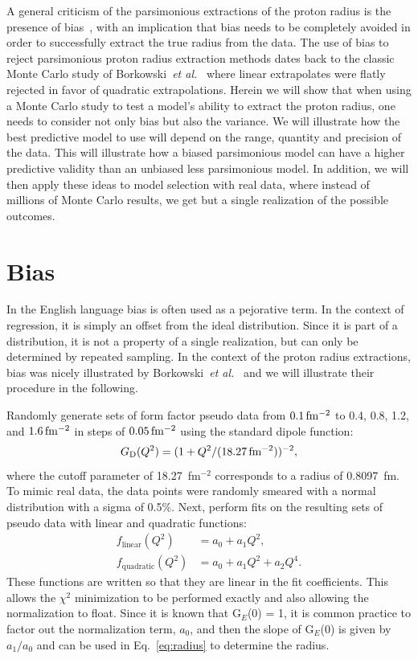 \documentclass[10pt,aps,prc,twocolumn]{revtex4-1}
\begin{document}
A general criticism of the parsimonious extractions of the proton radius is the presence of bias~\cite{Sick:2017aor,Sick:2018fzn},
with an implication that bias needs to be completely avoided in order to successfully extract the true radius from the data.
The use of bias to reject parsimonious proton radius extraction methods dates back to the classic Monte Carlo 
study of Borkowski~{\it{et al.}}~\cite{Borkowski:1975ume} where linear extrapolates were flatly rejected in favor of quadratic
extrapolations.  Herein we will show that when using a Monte Carlo study to test a model's ability
to extract the proton radius, one needs to consider not only bias but also the variance.  We will illustrate how 
the best predictive model to use will depend on the range, quantity and precision of the data.
This will illustrate how a biased parsimonious model can have a higher predictive 
validity than an unbiased less parsimonious model.   In addition, we will then apply these ideas to model selection with real
data, where instead of millions of Monte Carlo results, we get but a single realization of the possible outcomes.  


\section{Bias}

In the English language bias is often used as a pejorative term. In the context of regression, it is simply
an offset from the ideal distribution.   Since it is part of a distribution, it
is not a property of a single realization, but can only be determined by repeated sampling.    In the context of the proton 
radius extractions, bias was nicely illustrated by Borkowski~{\it{et al.}}~\cite{Borkowski:1975ume} and we will
illustrate their procedure in the following.

Randomly generate sets of form factor pseudo data 
from $\unit[0.1]{fm^{-2}}$ to 0.4, 0.8, 1.2,
and $\unit[1.6]{fm^{-2}}$ 
in steps of $\unit[0.05]{fm^{-2}}$ 
using the standard dipole function:
\begin{equation}
\label{sd}
G\mathrm{_D}(Q^2) = ( 1 + Q^2/(\unit[18.27]{fm^{-2}}))^{-2},
\end{equation}
where the cutoff parameter of 18.27~fm$^{-2}$ corresponds to a radius of 0.8097~fm.
To mimic real data, the data points were randomly smeared with a normal distribution
with a sigma of 0.5\%.  
Next, perform fits on the resulting sets of pseudo data with linear and quadratic functions:
\begin{align}
f_{\mathrm{linear}}(Q^2) &  = a_0 + a_1 Q^2, \label{Eq:linear} \\
f_{\mathrm{quadratic}}(Q^2) & = a_0 + a_1 Q^2 + a_2 Q^4. \label{Eq:quadratic}
\end{align}
These functions are written so that they are linear in the fit coefficients.  
This allows the $\chi^2$ minimization to be performed exactly
and also allowing the normalization to float.   Since it is known that
G$_E$(0) = 1, it is common practice to factor out the normalization term, $a_0$, and 
then the slope of G$_E$(0) is given by $a_1/a_0$ and can be used in Eq.~\ref{eq:radius} 
to determine the radius.
\end{document}
